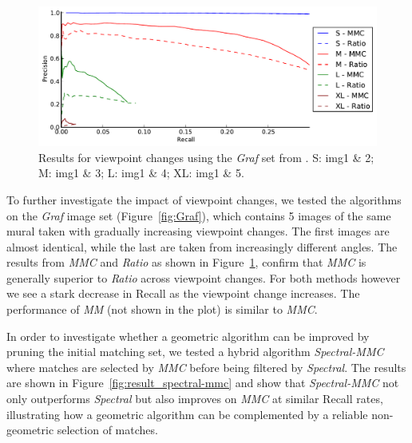 \begin{figure}[htb]
	\centering
	\includegraphics[width=1\textwidth]{images/result_viewpoint}
    \caption{Results for viewpoint changes using the \emph{Graf} set 
    from \cite{mikolajczyk2005performance}.  S: img1 \& 2; M: img1 \& 3; 
    L: img1 \& 4; XL: img1 \& 5.}
	\label{fig:result_viewpoint}
\end{figure}

To further investigate the impact of viewpoint changes, we tested the 
algorithms on the \emph{Graf} image set (Figure~\ref{fig:Graf}), which 
contains 5 images of the same mural taken with gradually increasing 
viewpoint changes.  The first images are almost identical, while the 
last are taken from increasingly different angles. The results from   
\emph{MMC} and \emph{Ratio} as shown in 
Figure~\ref{fig:result_viewpoint}, confirm that \emph{MMC} is generally 
superior to \emph{Ratio} across viewpoint changes. For both methods 
however we see a stark decrease in Recall as the viewpoint change 
increases. The performance of \emph{MM} (not shown in the plot) is 
similar to \emph{MMC}.


In order to investigate whether a geometric algorithm can be improved by
pruning the initial matching set, we tested a hybrid algorithm 
\emph{Spectral-MMC} where matches are selected by \emph{MMC} before 
being filtered by \emph{Spectral}. The results are shown in 
Figure~\ref{fig:result_spectral-mmc} and show that \emph{Spectral-MMC} 
not only outperforms \emph{Spectral} but also improves on \emph{MMC} at 
similar Recall rates, illustrating how a geometric algorithm can be 
complemented by a reliable non-geometric selection of matches.

